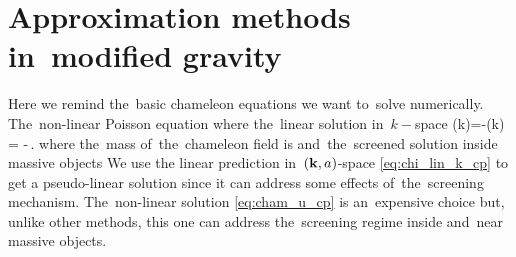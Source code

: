 \section{Approximation methods in~modified gravity}
Here we remind the~basic chameleon equations we want to~solve numerically. The~non-linear Poisson equation
where
the~linear solution in~$k-$space
\eq
{
\label{eq:chi_lin_k_cp}
	\hat{\chi}(k)=-\hat{\delta}(k) = -\,.
}
where the~mass of~the~chameleon field is
and~the~screened solution inside massive objects
We use the linear prediction in~$(\mathbf k, a)$-space \eqref{eq:chi_lin_k_cp} to get a pseudo-linear solution since it can address some effects of~the~screening mechanism. The~non-linear solution \eqref{eq:cham_u_cp} is an~expensive choice but, unlike other methods, this one can address the~screening regime inside and~near massive objects.





